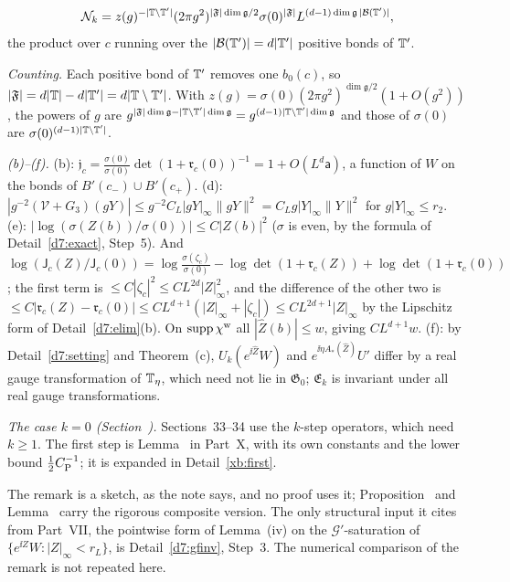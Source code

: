 \begin{detail}
\begin{step}
\[
\mathcal N_k=z(g)^{-|\mathbb T\setminus\mathbb T'|}(2\pi g^2)^{|\mathfrak F|\dim\mathfrak g/2}\sigma(0)^{|\mathfrak F|}L^{(d-1)\dim\mathfrak g\,|\mathcal B(\mathbb T')|},
\]
the product over $c$ running over the $|\mathcal B(\mathbb T')|=d|\mathbb T'|$ positive bonds of $\mathbb T'$.
\end{step}
\begin{step}
\emph{Counting.} Each positive bond of $\mathbb T'$ removes one $b_0(c)$, so $|\mathfrak F|=d|\mathbb T|-d|\mathbb T'|=d|\mathbb T\setminus\mathbb T'|$. With $z(g)=\sigma(0)(2\pi g^2)^{\dim\mathfrak g/2}(1+O(g^2))$, the powers of $g$ are $g^{|\mathfrak F|\dim\mathfrak g-|\mathbb T\setminus\mathbb T'|\dim\mathfrak g}=g^{(d-1)|\mathbb T\setminus\mathbb T'|\dim\mathfrak g}$ and those of $\sigma(0)$ are $\sigma(0)^{(d-1)|\mathbb T\setminus\mathbb T'|}$.
\end{step}
\begin{step}
\emph{(b)--(f).} (b): $\mathfrak j_c=\frac{\sigma(0)}{\sigma(0)}\det(1+\mathfrak r_c(0))^{-1}=1+O(L^d\mathsf a)$, a function of $W$ on the bonds of $B'(c_-)\cup B'(c_+)$. (d): $|g^{-2}(\mathcal V+G_3)(gY)|\le g^{-2}C_L|gY|_\infty\|gY\|^2=C_Lg|Y|_\infty\|Y\|^2$ for $g|Y|_\infty\le r_2$. (e): $|\log(\sigma(Z(b))/\sigma(0))|\le C|Z(b)|^2$ ($\sigma$ is even, by the formula of Detail~\ref{d7:exact}, Step~5). And $\log(\mathsf J_c(Z)/\mathsf J_c(0))=\log\frac{\sigma(\zeta_c)}{\sigma(0)}-\log\det(1+\mathfrak r_c(Z))+\log\det(1+\mathfrak r_c(0))$; the first term is $\le C|\zeta_c|^2\le CL^{2d}|Z|^2_\infty$, and the difference of the other two is $\le C|\mathfrak r_c(Z)-\mathfrak r_c(0)|\le CL^{d+1}(|Z|_\infty+|\zeta_c|)\le CL^{2d+1}|Z|_\infty$ by the Lipschitz form of Detail~\ref{d7:elim}(b). On $\operatorname{supp}\chi^{\rm w}$ all $|\hat Z(b)|\le w$, giving $CL^{d+1}w$. (f): by Detail~\ref{d7:setting} and Theorem~(c), $U_k(e^{\ii\hat Z}W)$ and $e^{\ii\eta A_*(\hat Z)}U'$ differ by a real gauge transformation of $\mathbb T_\eta$, which need not lie in $\mathfrak G_0$; $\mathfrak E_k$ is invariant under all real gauge transformations.
\end{step}
\begin{step}
\emph{The case $k=0$ (Section~).} Sections~33--34 use the $k$-step operators, which need $k\ge1$. The first step is Lemma~ in Part~X, with its own constants and the lower bound $\frac12C_{\rm P}^{-1}$; it is expanded in Detail~\ref{xb:first}.
\end{step}
\end{detail}

\begin{detail}\label{d7:oneloop}
The remark is a sketch, as the note says, and no proof uses it; Proposition~ and Lemma~ carry the rigorous composite version. The only structural input it cites from Part~VII, the pointwise form of Lemma~(iv) on the $\mathcal G'$-saturation of $\{e^{\ii Z}W:|Z|_\infty<r_L\}$, is Detail~\ref{d7:gfinv}, Step~3. The numerical comparison of the remark is not repeated here.
\end{detail}

